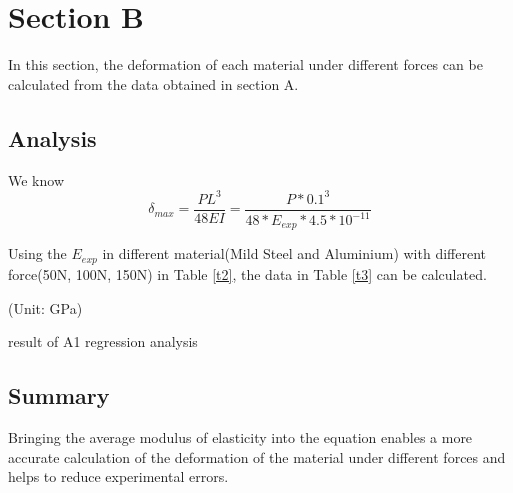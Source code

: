 \section*{Section B}
\label{sec:Section B}
\FloatBarrier %
In this section, the deformation of each material under different 
forces can be calculated from the data obtained in section A.

\subsection*{Analysis}

We know
\begin{equation} 
    \delta_{max}=\frac{PL^3}{48EI}=\frac{P*0.1^3}{48*E_{exp}*4.5*10^{-11}}
\end{equation}

Using the $E_{exp}$ in different material(Mild Steel and Aluminium)
 with different force(50N, 100N, 150N) in Table \ref{t2}, the data in Table \ref{t3} can be calculated.

\begin{minipage}[htbp]{\textwidth}
    \makeatletter{}
    \centering
    
    (Unit: GPa)
    \caption{result of A1 regression analysis}
    \label{t3} 
\end{minipage}

\subsection*{Summary}

Bringing the average modulus of elasticity into the equation enables 
a more accurate calculation of the deformation of the material under 
different forces and helps to reduce experimental errors.